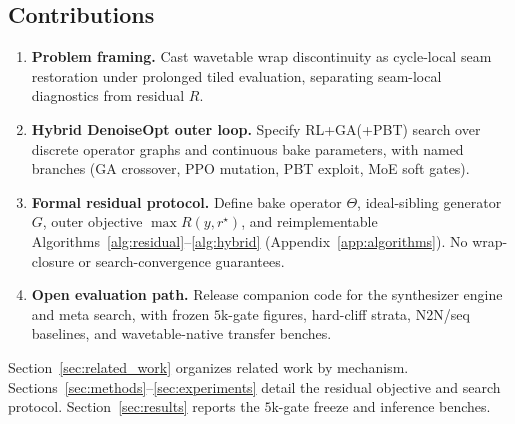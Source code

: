 \subsection{Contributions}
\label{sec:contributions}
\begin{enumerate}
  \item \textbf{Problem framing.} Cast wavetable wrap discontinuity as cycle-local seam restoration under prolonged tiled evaluation, separating seam-local diagnostics from residual $R$.
  \item \textbf{Hybrid DenoiseOpt outer loop.} Specify RL+GA(+PBT) search over discrete operator graphs and continuous bake parameters, with named branches (GA crossover, PPO mutation, PBT exploit, MoE soft gates).
  \item \textbf{Formal residual protocol.} Define bake operator $\Theta$, ideal-sibling generator $G$, outer objective $\max R(y,r^{\star})$, and reimplementable Algorithms~\ref{alg:residual}--\ref{alg:hybrid} (Appendix~\ref{app:algorithms}). No wrap-closure or search-convergence guarantees.
  \item \textbf{Open evaluation path.} Release companion code for the synthesizer engine and meta search, with frozen $5$k-gate figures, hard-cliff strata, N2N/seq baselines, and wavetable-native transfer benches.
\end{enumerate}

Section~\ref{sec:related_work} organizes related work by mechanism.
Sections~\ref{sec:methods}--\ref{sec:experiments} detail the residual objective and search protocol.
Section~\ref{sec:results} reports the $5$k-gate freeze and inference benches.
